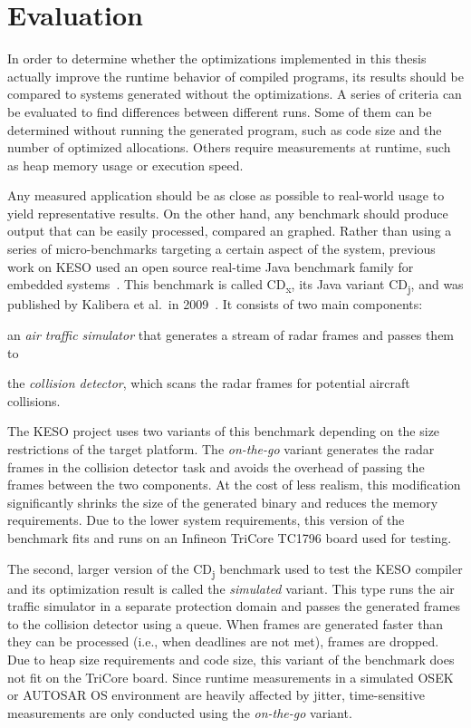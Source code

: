 
\chapter{Evaluation}
	\label{chapter:eval}
	In order to determine whether the optimizations implemented in this thesis actually improve the runtime behavior of
	compiled programs, its results should be compared to systems generated without the optimizations. A series of criteria
	can be evaluated to find differences between different runs. Some of them can be determined without running the
	generated program, such as code size and the number of optimized allocations. Others require measurements at runtime,
	such as heap memory usage or execution speed.

	Any measured application should be as close as possible to real-world usage to yield representative results. On the
	other hand, any benchmark should produce output that can be easily processed, compared an graphed. Rather than using
	a series of micro-benchmarks targeting a certain aspect of the system, previous work on KESO used an open source
	real-time Java benchmark family for embedded systems~\cite{erhardt:11:diplom, erhardt:11:jtres, stilkerich:11:cpe}.
	This benchmark is called CD\textsubscript{x}, its Java variant CD\textsubscript{j}, and was published by Kalibera et
	al.\ in 2009~\cite{kalibera:09:jtres}. It consists of two main components:
	\begin{inparaenum}[(a)]
		\item an \emph{air traffic simulator} that generates a stream of radar frames and passes them to
		\item the \emph{collision detector}, which scans the radar frames for potential aircraft collisions.
	\end{inparaenum}

	The KESO project uses two variants of this benchmark depending on the size restrictions of the target platform. The
	\emph{on-the-go} variant generates the radar frames in the collision detector task and avoids the overhead of passing
	the frames between the two components. At the cost of less realism, this modification significantly shrinks the size
	of the generated binary and reduces the memory requirements. Due to the lower system requirements, this version of the
	benchmark fits and runs on an Infineon TriCore TC1796 board used for testing.

	The second, larger version of the CD\textsubscript{j} benchmark used to test the KESO compiler and its optimization
	result is called the \emph{simulated} variant. This type runs the air traffic simulator in a separate protection
	domain and passes the generated frames to the collision detector using a queue. When frames are generated faster than
	they can be processed (i.e., when deadlines are not met), frames are dropped. Due to heap size requirements and code
	size, this variant of the benchmark does not fit on the TriCore board. Since runtime measurements in a simulated OSEK
	or AUTOSAR OS environment are heavily affected by jitter, time-sensitive measurements are only conducted using the
	\emph{on-the-go} variant.

